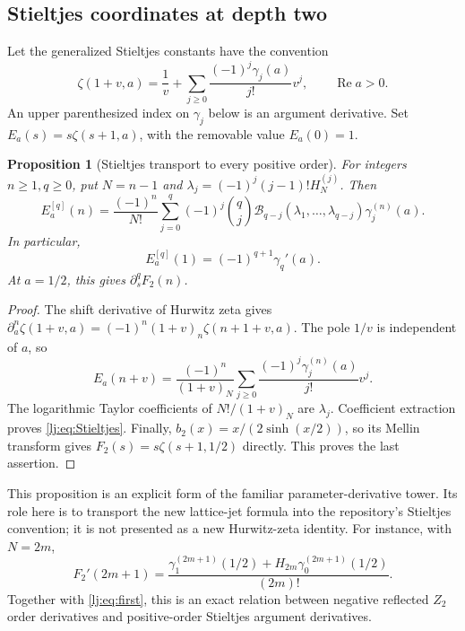 \documentclass[11pt,a4paper]{article}
\numberwithin{equation}{section}
\newtheorem{proposition}[theorem]{Proposition}
\theoremstyle{definition}
\theoremstyle{remark}
\DeclareMathOperator{\re}{Re}
\begin{document}
\subsection{Stieltjes coordinates at depth two}

Let the generalized Stieltjes constants have the convention
\[
 \zeta(1+v,a)=\frac1v+
       \sum_{j\geq0}\frac{(-1)^j\gamma_j(a)}{j!}v^j,
       \qquad \re a>0.
\]
An upper parenthesized index on $\gamma_j$ below is an argument
derivative. Set $E_a(s)=s\zeta(s+1,a)$, with the removable value
$E_a(0)=1$.

\begin{proposition}[Stieltjes transport to every positive order]
\label{lj:prop:Stieltjes}
For integers $n\geq1,q\geq0$, put $N=n-1$ and
$\lambda_j=(-1)^j(j-1)!H_N^{(j)}$. Then
\begin{equation}
 \boxed{\displaystyle
 E_a^{[q]}(n)=\frac{(-1)^n}{N!}
   \sum_{j=0}^q(-1)^j\binom qj
       \mathcal B_{q-j}(\lambda_1,\ldots,\lambda_{q-j})
       \gamma_j^{(n)}(a).}
 \label{lj:eq:Stieltjes}
\end{equation}
In particular,
\begin{equation}
 E_a^{[q]}(1)=(-1)^{q+1}\gamma_q'(a).
 \label{lj:eq:Stieltjesone}
\end{equation}
At $a=1/2$, this gives $\partial_s^qF_2(n)$.
\end{proposition}

\begin{proof}
The shift derivative of Hurwitz zeta gives
$\partial_a^n\zeta(1+v,a)=(-1)^n(1+v)_n\zeta(n+1+v,a)$.
The pole $1/v$ is independent of $a$, so
\begin{equation}
 E_a(n+v)=\frac{(-1)^n}{(1+v)_N}
       \sum_{j\geq0}\frac{(-1)^j\gamma_j^{(n)}(a)}{j!}v^j.
 \label{lj:eq:Stieltjesgerm}
\end{equation}
The logarithmic Taylor coefficients of $N!/(1+v)_N$ are $\lambda_j$.
Coefficient extraction proves \eqref{lj:eq:Stieltjes}.
Finally, $b_2(x)=x/(2\sinh(x/2))$, so its Mellin transform gives
$F_2(s)=s\zeta(s+1,1/2)$ directly. This proves the last assertion.
\end{proof}

This proposition is an explicit form of the familiar parameter-derivative
tower. Its role here is to transport the new lattice-jet formula into
the repository's Stieltjes convention; it is not presented as a new
Hurwitz-zeta identity. For instance, with $N=2m$,
\[
 F_2'(2m+1)=\frac{
       \gamma_1^{(2m+1)}(1/2)
        +H_{2m}\gamma_0^{(2m+1)}(1/2)}{(2m)!}.
\]
Together with \eqref{lj:eq:first}, this is an exact relation between
negative reflected $Z_2$ order derivatives and positive-order Stieltjes
argument derivatives.
\end{document}
